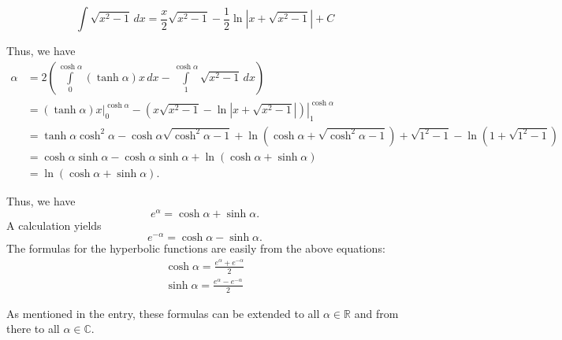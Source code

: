 \documentclass[12pt]{article}
\begin{document}
\[
\int\sqrt{x^2-1} \, dx=\frac{x}{2}\sqrt{x^2-1}-\frac{1}{2}\ln\left|x+\sqrt{x^2-1}\right|+C
\]

Thus, we have
\begin{align*}
\alpha & =2\left( \int\limits_0^{\cosh\alpha} (\tanh\alpha)x \, dx -\int\limits_1^{\cosh\alpha}\sqrt{x^2-1} \, dx \right) \\
& =\left. (\tanh\alpha)x \right|_0^{\cosh\alpha}-\left. \left( x\sqrt{x^2-1}-\ln\left|x+\sqrt{x^2-1}\right| \right) \right|_1^{\cosh\alpha} \\
& =\tanh\alpha\cosh^2\alpha-\cosh\alpha\sqrt{\cosh^2\alpha-1}+\ln\left(\cosh\alpha+\sqrt{\cosh^2\alpha-1}\right) +\sqrt{1^2-1}-\ln\left(1+\sqrt{1^2-1}\right) \\
& =\cosh\alpha\sinh\alpha-\cosh\alpha\sinh\alpha+\ln(\cosh\alpha+\sinh\alpha) \\
& =\ln(\cosh\alpha+\sinh\alpha).
\end{align*}

Thus, we have
\[
e^{\alpha}=\cosh\alpha+\sinh\alpha.
\]
A  calculation yields
\[
e^{-\alpha}=\cosh\alpha-\sinh\alpha.
\]
The formulas for the hyperbolic functions are easily  from the above equations:
\begin{align*}
\cosh\alpha=\frac{e^{\alpha}+e^{-\alpha}}{2} \\
\sinh\alpha=\frac{e^{\alpha}-e^{-\alpha}}{2}
\end{align*}

As mentioned in the  entry, these formulas can be extended to all $\alpha\in\mathbb{R}$ and from there to all $\alpha\in\mathbb{C}$.
\end{document}
